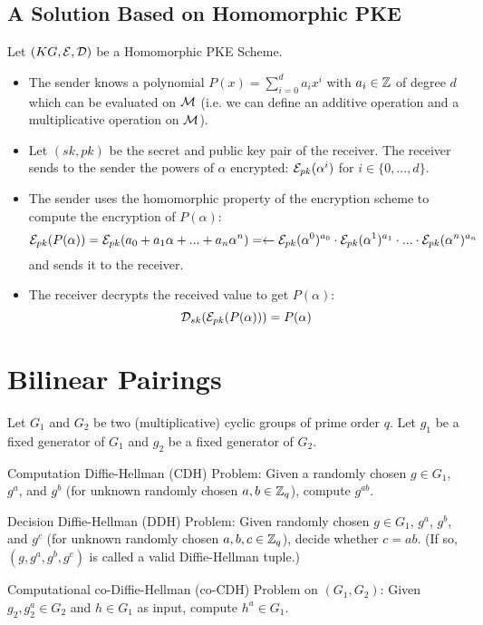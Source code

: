 \subsection{A Solution Based on Homomorphic PKE}
Let $(KG,\mathcal{E},\mathcal{D})$ be a Homomorphic PKE Scheme.
\begin{itemize}[align = left, leftmargin=*, label={--}]
\item The sender knows a polynomial $P(x) = \sum_{i=0}^d a_i x^i$ with $a_i \in {\mathbb Z}$ of degree $d$ which can be evaluated on $\mathcal{M}$ (i.e. we can define an additive operation and a multiplicative operation on $\mathcal{M}$). 

\item Let $(sk,pk)$ be the secret and public key pair of the receiver. The receiver sends to the sender the powers of $\alpha$ encrypted: $\mathcal{E}_{pk}(\alpha^i)$ for $i \in \{0, ..., d\}$.

\item The sender uses the homomorphic property of the encryption scheme to compute the encryption of $P(\alpha)$: $$\mathcal{E}_{pk}(P(\alpha)) = \mathcal{E}_{pk}(a_0 + a_1 \alpha + ... + a_n \alpha^n) = \leftarrow \mathcal{E}_{pk}(\alpha^0)^{a_0} \cdot \mathcal{E}_{pk}(\alpha^1)^{a_1} \cdot ... \cdot \mathcal{E}_{pk}(\alpha^n)^{a_n}$$
and sends it to the receiver.

\item The receiver decrypts the received value to get $P(\alpha)$:
$$\mathcal{D}_{sk}(\mathcal{E}_{pk}(P(\alpha))) = P(\alpha) $$

\end{itemize}

\section{Bilinear Pairings}
\nocite{DiHe76}

Let $G_1$ and $G_2$ be two (multiplicative) cyclic groups of prime order $q$. Let $g_1$ be a fixed generator of $G_1$ and $g_2$ be a fixed generator of $G_2$.

 Computation Diffie-Hellman (CDH) Problem: Given a randomly chosen $g \in G_1$, $g^a$, and $g^b$ (for unknown randomly chosen $a,b \in {\mathbb Z}_q$), compute $g^{ab}$.

 Decision Diffie-Hellman (DDH) Problem: Given randomly chosen $g \in G_1$, $g^a$, $g^b$, and $g^c$ (for unknown randomly chosen $a,b,c \in {\mathbb Z}_q$), decide whether $c = ab$. (If so, $(g, g^a, g^b, g^c)$ is called a valid Diffie-Hellman tuple.)

 Computational co-Diffie-Hellman (co-CDH) Problem on $(G_1, G_2)$: Given $g_2, g^a_2 \in G_2$ and $h \in G_1$ as input, compute $h^a \in G_1$.

